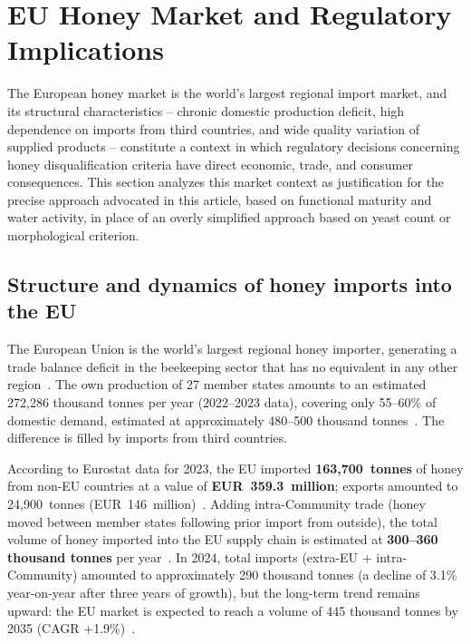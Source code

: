 
\section{EU Honey Market and Regulatory Implications}

The European honey market is the world's largest regional import
market, and its structural characteristics -- chronic domestic
production deficit, high dependence on imports from third countries,
and wide quality variation of supplied products -- constitute
a context in which regulatory decisions concerning honey
disqualification criteria have direct economic, trade, and consumer
consequences. This section analyzes this market context as
justification for the precise approach advocated in this article,
based on functional maturity and water activity, in place of an
overly simplified approach based on yeast count or morphological
criterion.

\subsection{Structure and dynamics of honey imports into the EU}

The European Union is the world's largest regional honey importer,
generating a trade balance deficit in the beekeeping sector that
has no equivalent in any other region~\cite{cbi2024,pollinatorhub2025}.
The own production of 27 member states amounts to an estimated
272,286 thousand tonnes per year (2022--2023 data), covering
only 55--60\% of domestic demand, estimated at approximately
480--500 thousand tonnes~\cite{pollinatorhub2025,ec_honey_autumn2024}.
The difference is filled by imports from third countries.

According to Eurostat data for 2023, the EU imported
\textbf{163,700~tonnes} of honey from non-EU countries at a value
of \textbf{EUR~359.3~million}; exports amounted to 24,900~tonnes
(EUR~146~million)~\cite{eurostat_honey2023}. Adding intra-Community
trade (honey moved between member states following prior import
from outside), the total volume of honey imported into the EU
supply chain is estimated at \textbf{300--360 thousand tonnes}
per year~\cite{cbi2024}.
In 2024, total imports (extra-EU + intra-Community) amounted to
approximately 290 thousand tonnes (a decline of 3.1\% year-on-year
after three years of growth), but the long-term trend remains
upward: the EU market is expected to reach a volume of 445 thousand
tonnes by 2035 (CAGR +1.9\%)~\cite{eurostat_honey2023}.


